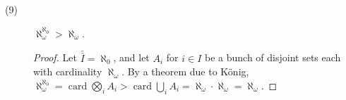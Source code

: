 \documentclass[12pt]{article}
\DeclareMathOperator{\wcard}{card}
\newcommand{\card}[1]{\bar{\bar{#1}}}
\begin{document}
\begin{description}
\item[(9)]
  $\aleph_\omega^{\aleph_0} > \aleph_\omega$.
  \begin{proof}
    Let $\card{I} = \aleph_0$, and let $A_i$ for $i \in I$ be a bunch of
	disjoint sets each with cardinality $\aleph_\omega$.
	By a theorem due to K\"onig, $\aleph_\omega^{\aleph_0} = 
	\wcard{\bigotimes\limits_{i}{A_i}} > 
	\wcard{\bigcup\limits_{i}{A_i}} = \aleph_\omega \cdot
	\aleph_\omega = \aleph_\omega$.
  \end{proof}

\end{description}
\end{document}
